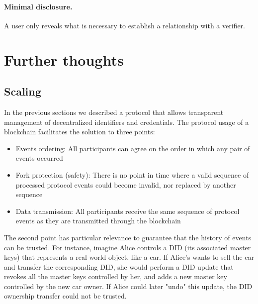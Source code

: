 \documentclass[10pt,a4paper]{article}
\begin{document}
\paragraph{Minimal disclosure.} A user only reveals what is necessary to establish a relationship with a verifier.


\section{Further thoughts}

\subsection{Scaling} 

In the previous sections we described a protocol that allows transparent management of decentralized identifiers and credentials.
The protocol usage of a blockchain facilitates the solution to three points:
\begin{itemize}
\item Events ordering: All participants can agree on the order in which any pair of events occurred 
\item Fork protection (safety): There is no point in time where a valid sequence of processed protocol events could become invalid, nor replaced by 
      another sequence
\item Data transmission: All participants receive the same sequence of protocol events as they are transmitted through the blockchain
\end{itemize}

The second point has particular relevance to guarantee that the history of events can be trusted. For instance, imagine Alice controls a DID (its 
associated master keys) that represents a real world object, like a car. If Alice's wants to sell the car and transfer the corresponding DID, she 
would perform a DID update that revokes all the master keys controlled by her, and adds a new master key controlled by the new car owner. If Alice 
could later "undo" this update, the DID ownership transfer could not be trusted.
\end{document}
